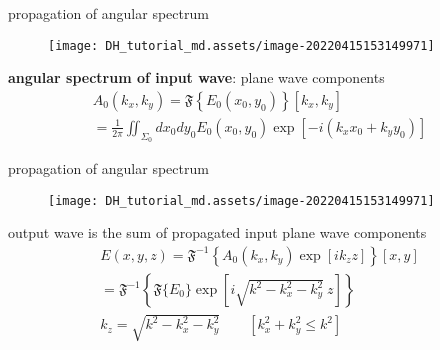 \documentclass[t, aspectratio=169]{beamer}
\begin{document}


\begin{frame}{propagation of angular spectrum}
	\begin{figure}
		\texttt{[image: DH\_tutorial\_md.assets/image-20220415153149971]}
	\end{figure}
	\textbf{angular spectrum of input wave}: plane wave components
	\begin{gather*}
A_0(k_x,k_y) = \mathfrak F\left\{E_0(x_0,y_0)\right\}\left[k_x,k_y\right] \\
=\frac{1}{2\pi}\iint_{\Sigma_0} dx_0 dy_0 E_0(x_0,y_0) \exp\left[-i(k_x x_0 + k_y y_0)\right]
	\end{gather*}
\end{frame}


\begin{frame}{propagation of angular spectrum}
	\begin{figure}
		\texttt{[image: DH\_tutorial\_md.assets/image-20220415153149971]}
	\end{figure}
output wave is the sum of propagated input plane wave components
	\begin{gather*}
E(x,y,z) = \mathfrak F^{-1}\left\{A_0(k_x,k_y) \exp[ik_z z]\right\}[x,y] \\
= \mathfrak F^{-1}\left\{\mathfrak F\{E_0\}\exp\left[i\sqrt{k^2 - k_x^2 - k_y^2}\ z\right]\right\} \\
k_z = \sqrt{k^2 - k_x^2 - k_y^2} \qquad \left[ k_x^2 + k_y^2 \le k^2 \right]	
	\end{gather*}
\end{frame}
\end{document}
